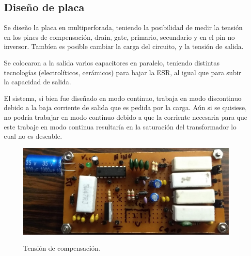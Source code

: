 %
%
%

\subsection{Diseño de placa}
Se diseño la placa en multiperforada, teniendo la posibilidad de medir la tensión en los pines de compensación, drain, gate, primario, secundario y en el pin no inversor. Tambíen es posible cambiar la carga del circuito, y la tensión de salida.

Se colocaron a la salida varios capacitores en paralelo, teniendo distintas tecnologías (electrolíticos, cerámicos) para bajar la ESR, al igual que para subir la capacidad de salida. 

El sistema, si bien fue diseñado en modo continuo, trabaja en modo discontinuo debido a la baja corriente de salida que es pedida por la carga. Aún si se quisiese, no podría trabajar en modo continuo debido a que la corriente necesaria para que este trabaje en modo continua resultaría en la saturación del transformador lo cual no es deseable.

\begin{figure}[H]
	\centering
	\includegraphics[width=0.7\linewidth]{ImagenesParteIV/placa_facha.png}
	\label{fig:vcom_4}
	\caption{Tensión de compensación.}
\end{figure}


